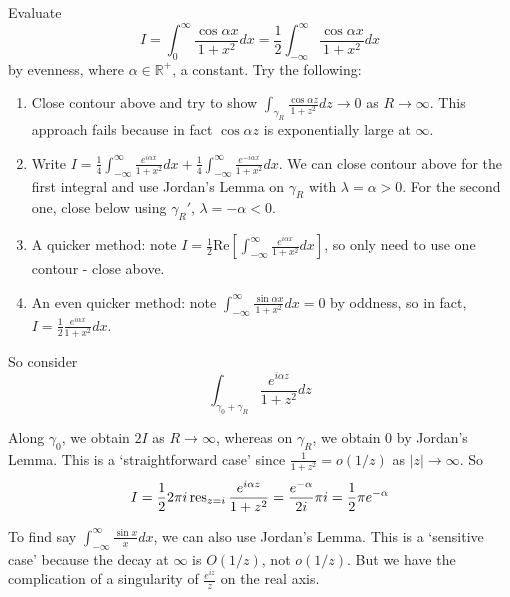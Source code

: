 \documentclass[a4paper]{article}
\begin{document}
\begin{eg}
Evaluate
$$I=\int_0^\infty\frac{\cos\alpha x}{1+x^2}dx=\frac{1}{2}\int_{-\infty}^\infty\frac{\cos\alpha x}{1+x^2}dx$$
by evenness, where $\alpha\in\mathbb{R}^+$, a constant. Try the following:
\begin{enumerate}
    \item Close contour above and try to show $\int_{\gamma_R}\frac{\cos\alpha z}{1+z^2}dz\rightarrow 0$ as $R\rightarrow\infty$. This approach fails because in fact $\cos\alpha z$ is exponentially large at $\infty$.
    \item Write $I=\frac{1}{4}\int_{-\infty}^\infty\frac{e^{i\alpha x}}{1+x^2}dx+\frac{1}{4}\int_{-\infty}^\infty\frac{e^{-i\alpha x}}{1+x^2}dx$. We can close contour above for the first integral and use Jordan's Lemma on $\gamma_R$ with $\lambda=\alpha>0$. For the second one, close below using $\gamma_R'$, $\lambda=-\alpha<0$.
    \item A quicker method: note $I=\frac{1}{2}\text{Re}[\int_{-\infty}^\infty\frac{e^{i\alpha x}}{1+x^2}dx]$, so only need to use one contour - close above.
    \item An even quicker method: note $\int_{-\infty}^\infty\frac{\sin\alpha x}{1+x^2}dx=0$ by oddness, so in fact, $I=\frac{1}{2}\frac{e^{i\alpha x}}{1+x^2}dx$. 
\end{enumerate}
So consider
$$\int_{\gamma_0+\gamma_R}\frac{e^{i\alpha z}}{1+z^2}dz$$
\begin{center}
  \end{center}
Along $\gamma_0$, we obtain $2I$ as $R\rightarrow\infty$, whereas on $\gamma_R$, we obtain 0 by Jordan's Lemma. This is a `straightforward case' since $\frac{1}{1+z^2}=o(1/z)$ as $|z|\rightarrow\infty$. So 
$$I=\frac{1}{2}2\pi i\operatorname{res}_{z=i}\frac{e^{i\alpha z}}{1+z^2}=\frac{e^{-\alpha}}{2i}\pi i=\frac{1}{2}\pi e^{-\alpha}$$
\end{eg}
To find say $\int_{-\infty}^\infty\frac{\sin x}{x}dx$, we can also use Jordan's Lemma. This is a `sensitive case' because the decay at $\infty$ is $O(1/z)$, not $o(1/z)$. But we have the complication of a singularity of $\frac{e^{iz}}{z}$ on the real axis.
\end{document}
